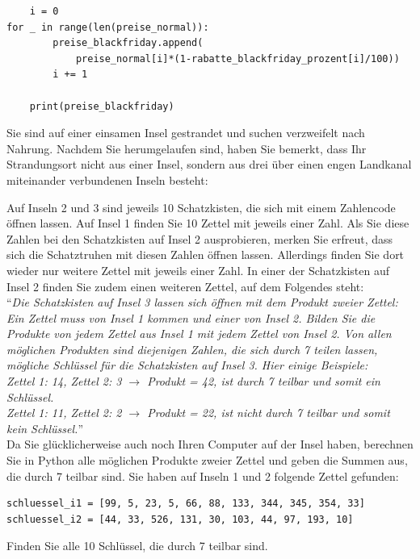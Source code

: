 \begin{questions}
\begin{solution}
\begin{lstlisting}
    i = 0
for _ in range(len(preise_normal)):
        preise_blackfriday.append(
            preise_normal[i]*(1-rabatte_blackfriday_prozent[i]/100))
        i += 1

    print(preise_blackfriday)
    \end{lstlisting}
	\end{solution}

\clearpage
{}

Sie sind auf einer einsamen Insel gestrandet und suchen verzweifelt nach Nahrung. Nachdem Sie herumgelaufen sind, haben Sie bemerkt, dass Ihr Strandungsort nicht aus einer Insel, sondern aus drei über einen engen Landkanal miteinander verbundenen Inseln besteht:
\begin{figure}[H]
	\centering
\end{figure}
Auf Inseln 2 und 3 sind jeweils 10 Schatzkisten, die sich mit einem Zahlencode öffnen lassen. Auf Insel 1 finden Sie 10 Zettel mit jeweils einer Zahl. Als Sie diese Zahlen bei den Schatzkisten auf Insel 2 ausprobieren, merken Sie erfreut, dass sich die Schatztruhen mit diesen Zahlen öffnen lassen. Allerdings finden Sie dort wieder nur weitere Zettel mit jeweils einer Zahl. In einer der Schatzkisten auf Insel 2 finden Sie zudem einen weiteren Zettel, auf dem Folgendes steht:\\

``\textit{Die Schatzkisten auf Insel 3 lassen sich öffnen mit dem Produkt zweier Zettel: Ein Zettel muss von Insel 1 kommen und einer von Insel 2. Bilden Sie die Produkte von jedem Zettel aus Insel 1 mit jedem Zettel von Insel 2. Von allen möglichen Produkten sind diejenigen Zahlen, die sich durch 7 teilen lassen, mögliche Schlüssel für die Schatzkisten auf Insel 3. Hier einige Beispiele:\\
Zettel 1: 14, Zettel 2: 3 $\rightarrow$ Produkt = 42, ist durch 7 teilbar und somit ein Schlüssel.\\
Zettel 1: 11, Zettel 2: 2 $\rightarrow$ Produkt = 22, ist nicht durch 7 teilbar und somit kein Schlüssel.}''\\

Da Sie glücklicherweise auch noch Ihren Computer auf der Insel haben, berechnen Sie in Python alle möglichen Produkte zweier Zettel und geben die Summen aus, die durch 7 teilbar sind. Sie haben auf Inseln 1 und 2 folgende Zettel gefunden:
\begin{lstlisting}
schluessel_i1 = [99, 5, 23, 5, 66, 88, 133, 344, 345, 354, 33]
schluessel_i2 = [44, 33, 526, 131, 30, 103, 44, 97, 193, 10]
\end{lstlisting}
Finden Sie alle 10 Schlüssel, die durch 7 teilbar sind.


\end{questions}
